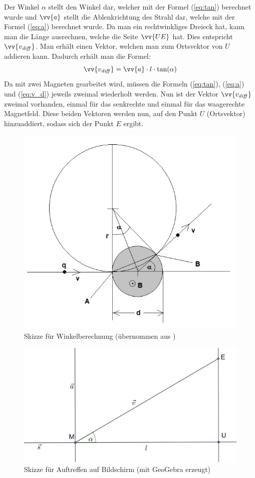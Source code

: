 Der Winkel $\alpha$ stellt den Winkel dar, welcher mit der Formel (\ref{eq:tan}) berechnet wurde und $\vv{a}$ stellt die Ablenkrichtung des Strahl dar, welche mit der Formel (\ref{eq:a}) berechnet wurde.
Da man ein rechtwinkliges Dreieck hat, kann man die Länge ausrechnen, welche die Seite $\vv{UE}$ hat.
Dies entspricht $\vv{v_\mathit{diff}}$.
Man erhält einen Vektor, welchen man zum Ortsvektor von $U$ addieren kann.
Dadurch erhält man die Formel:
\begin{equation}
    \label{eq:v_d}
    \vv{v_\mathit{diff}} =  \vv{a} \cdot l \cdot \tan(\alpha)
\end{equation}
Da mit zwei Magneten gearbeitet wird, müssen die Formeln (\ref{eq:tan}), (\ref{eq:a}) und (\ref{eq:v_d}) jeweils zweimal wiederholt werden.
Nun ist der Vektor $\vv{v_\mathit{diff}}$ zweimal vorhanden, einmal für das senkrechte und einmal für das waagerechte Magnetfeld.
Diese beiden Vektoren werden nun, auf den Punkt $U$ (Ortsvektor) hinzuaddiert, sodass sich der Punkt $E$ ergibt.
\begin{figure}
    \centering
    \includegraphics[width=.75\textwidth]{fig/elektronenstrahl-ablenkung_101.jpg}
    \caption{Skizze für Winkelberechnung (übernommen aus \cite{Blog})}
    \label{fig:ausBlog}
\end{figure}

\begin{figure}
    \centering
    \includegraphics[width=.75\textwidth]{fig/Bildschirm_Skizze.png}
    \caption{Skizze für Auftreffen auf Bildschirm (mit GeoGebra erzeugt)}
    \label{fig:Schirm}
\end{figure}

